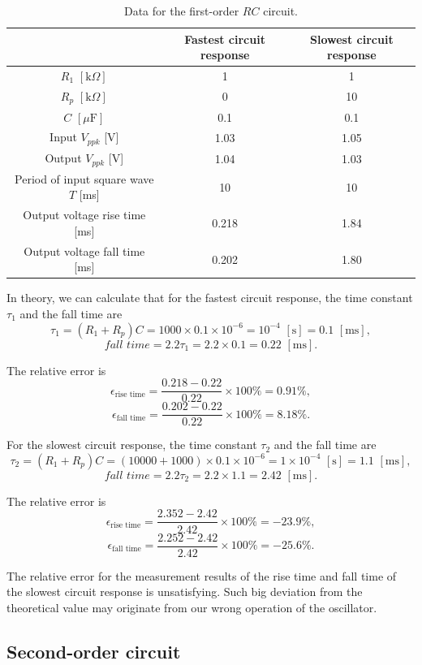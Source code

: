 \documentclass{article}
\begin{document}
\begin{table}[H]
\centering
\begin{tabular}{ccc}
\toprule
 & Fastest circuit response & Slowest circuit response\\
\midrule
$R_1\,\,[\text{k}\Omega]$ & 1 & 1\\
$R_p\,\,[\text{k}\Omega]$ & 0 & 10\\
$C\,\,[\mu\text{F}]$ & 0.1 & 0.1\\
Input $V_{ppk}$ [V] & 1.03 & 1.05\\
Output $V_{ppk}$ [V] & 1.04 & 1.03\\
Period of input square wave $T$ [ms] & 10 & 10\\
Output voltage rise time [ms] & 0.218 & 1.84\\
Output voltage fall time [ms] & 0.202 & 1.80\\
\bottomrule
\end{tabular}
\caption{Data for the first-order $RC$ circuit.}\label{Table1st}
\end{table}

In theory, we can calculate that for the fastest circuit response, the time constant $\tau_1$ and the fall time are
$$\tau_1 = (R_1+R_p)C = 1000 \times 0.1 \times 10^{-6} = 10^{-4}\,\,[\text{s}] = 0.1\,\,[\text{ms}],$$
$$fall\,\,time = 2.2\tau_1 = 2.2 \times 0.1 = 0.22\,\,[\text{ms}].$$

The relative error is
$$\epsilon_{\text{rise time}} = \frac{0.218-0.22}{0.22}\times 100\% = 0.91\%,$$
$$\epsilon_{\text{fall time}} = \frac{0.202-0.22}{0.22}\times 100\% = 8.18\%.$$

For the slowest circuit response, the time constant $\tau_2$ and the fall time are
$$\tau_2 = (R_1+R_p)C = (10000+1000) \times 0.1 \times 10^{-6} = 1 \times 10^{-4}\,\,[\text{s}] = 1.1\,\,[\text{ms}],$$
$$fall\,\,time= 2.2\tau_2 = 2.2 \times 1.1 = 2.42\,\,[\text{ms}].$$

The relative error is
$$\epsilon_{\text{rise time}} = \frac{2.352-2.42}{2.42}\times 100\% = -23.9\%,$$
$$\epsilon_{\text{fall time}} = \frac{2.252-2.42}{2.42} \times 100\% = -25.6\%.$$

The relative error for the measurement results of the rise time and fall time of the slowest circuit response is unsatisfying. Such big deviation from the theoretical value may originate from our wrong operation of the oscillator.

	\subsection{Second-order circuit}
\end{document}
